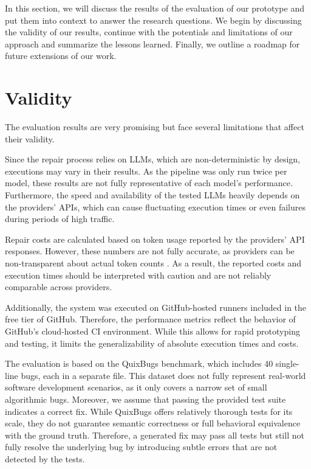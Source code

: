 In this section, we will discuss the results of the evaluation of our prototype and put them into context to answer the research questions. We begin by discussing the validity of our results, continue with the potentials and limitations of our approach and summarize the lessons learned. Finally, we outline a roadmap for future extensions of our work.

\section{Validity} \label{section:validity}

The evaluation results are very promising but face several limitations that affect their validity.

Since the repair process relies on \acp{LLM}, which are non-deterministic by design, executions may vary in their results. As the pipeline was only run twice per model, these results are not fully representative of each model's performance. Furthermore, the speed and availability of the tested \acp{LLM} heavily depends on the providers' APIs, which can cause fluctuating execution times or even failures during periods of high traffic.

Repair costs are calculated based on token usage reported by the providers' API responses. However, these numbers are not fully accurate, as providers can be non-transparent about actual token counts \cite{sunCoInCountingInvisible2025d}. As a result, the reported costs and execution times should be interpreted with caution and are not reliably comparable across providers.

Additionally, the system was executed on GitHub-hosted runners included in the free tier of GitHub. Therefore, the performance metrics reflect the behavior of GitHub's cloud-hosted CI environment. While this allows for rapid prototyping and testing, it limits the generalizability of absolute execution times and costs.

The evaluation is based on the QuixBugs benchmark, which includes 40 single-line bugs, each in a separate file. This dataset does not fully represent real-world software development scenarios, as it only covers a narrow set of small algorithmic bugs. Moreover, we assume that passing the provided test suite indicates a correct fix. While QuixBugs offers relatively thorough tests for its scale, they do not guarantee semantic correctness or full behavioral equivalence with the ground truth. Therefore, a generated fix may pass all tests but still not fully resolve the underlying bug by introducing subtle errors that are not detected by the tests.

